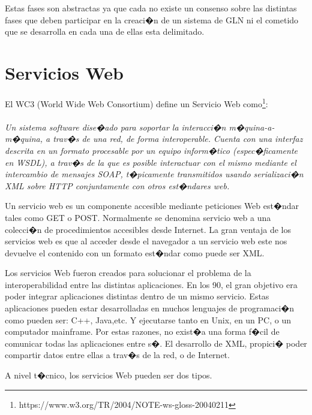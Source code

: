 Estas fases son abstractas ya que cada no existe un consenso sobre las distintas fases que deben participar en la creaci�n de un sistema de GLN ni el cometido que se desarrolla en cada una de ellas esta delimitado.

\section{Servicios Web}
\label{cap2:sec:ServiciosWeb}

El WC3 (World Wide Web Consortium) define un Servicio Web como\footnote{https://www.w3.org/TR/2004/NOTE-ws-gloss-20040211}:
\\
\\
\textit{
	Un sistema software dise�ado para soportar la interacci�n m�quina-a-m�quina, a trav�s de una red, de forma interoperable. Cuenta con una interfaz descrita en un formato procesable por un equipo inform�tico (espec�ficamente en WSDL), a trav�s de la que es posible interactuar con el mismo mediante el intercambio de mensajes SOAP, t�picamente transmitidos usando serializaci�n XML sobre HTTP conjuntamente con otros est�ndares web.
\\	
}

	Un servicio web es un componente accesible mediante peticiones Web est�ndar tales como GET o POST. Normalmente se denomina servicio web a una colecci�n de procedimientos accesibles desde Internet. La gran ventaja de los servicios web es que al acceder desde el navegador a un servicio web este nos devuelve el contenido con un formato est�ndar como puede ser XML.	

Los servicios Web fueron creados para solucionar el problema de la interoperabilidad entre las distintas aplicaciones. En los 90, el gran objetivo era poder integrar aplicaciones distintas dentro de un mismo servicio. Estas aplicaciones pueden estar desarrolladas en muchos lenguajes de programaci�n como pueden ser: C++, Java,etc. Y ejecutarse tanto en Unix, en un PC, o un computador mainframe.
Por estas razones, no exist�a una forma f�cil de comunicar todas las aplicaciones entre s�. El desarrollo de XML, propici� poder compartir datos entre ellas a trav�s de la red, o de Internet. 



A nivel t�cnico, los servicios Web pueden ser dos tipos.

